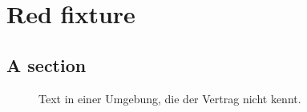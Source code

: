 \chapter{Red fixture}\label{c98}

\section{A section}\label{c98.s1}

\begin{figure}
Text in einer Umgebung, die der Vertrag nicht kennt.
\end{figure}
